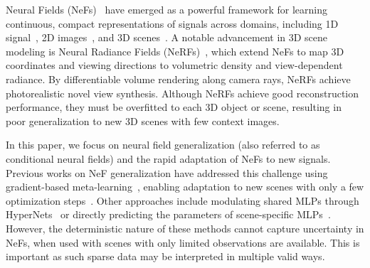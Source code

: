 
Neural Fields (NeFs)~\citep{sitzmann2020implicit,tancik2020fourier} have emerged as a powerful framework for learning continuous, compact representations of signals across domains, including 1D signal~\citep{yin2022continuous}, 2D images~\citep{sitzmann2020implicit}, and 3D scenes~\citep{park2019deepsdf,mescheder2019occupancy}. A notable advancement in 3D scene modeling is Neural Radiance Fields (NeRFs)~\citep{mildenhall2021nerf,barron2021mip}, which extend NeFs to map 3D coordinates and viewing directions to volumetric density and view-dependent radiance. By differentiable volume rendering along camera rays, NeRFs achieve photorealistic novel view synthesis.
Although NeRFs achieve good reconstruction performance, they must be overfitted to each 3D object or scene, resulting in poor generalization to new 3D scenes with few context images.




In this paper, we focus on neural field generalization (also referred to as conditional neural fields) and the rapid adaptation of NeFs to new signals. Previous works on NeF generalization have addressed this challenge using gradient-based meta-learning~\citep{tancik2021learned}, enabling adaptation to new scenes with only a few optimization steps~\citep{tancik2021learned,papa2023train}. Other approaches include modulating shared MLPs through HyperNets~\citep{chen2022transformers,mehta2021modulated,dupont2022data,kim2023generalizable} or directly predicting the parameters of scene-specific MLPs~\citep{dupont2021generative,erkocc2023hyperdiffusion}. However, the deterministic nature of these methods cannot capture uncertainty in NeFs, when used with scenes with only limited observations are available. This is important as such sparse data may be interpreted in multiple valid ways.

